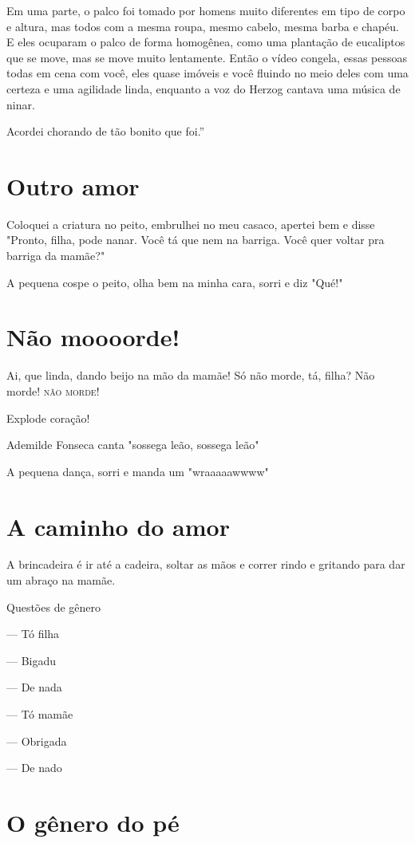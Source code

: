 Em uma parte, o palco foi tomado por homens muito diferentes em tipo de
corpo e altura, mas todos com a mesma roupa, mesmo cabelo, mesma barba e
chapéu. E eles ocuparam o palco de forma homogênea, como uma plantação
de eucaliptos que se move, mas se move muito lentamente. Então o vídeo
congela, essas pessoas todas em cena com você, eles quase imóveis e você
fluindo no meio deles com uma certeza e uma agilidade linda, enquanto a
voz do Herzog cantava uma música de ninar.

Acordei chorando de tão bonito que foi.''

\chapter{Outro amor}

Coloquei a criatura no peito, embrulhei no meu casaco, apertei bem e
disse "Pronto, filha, pode nanar. Você tá que nem na barriga. Você quer
voltar pra barriga da mamãe?"

A pequena cospe o peito, olha bem na minha cara, sorri e diz "Qué!"

\chapter{Não moooorde!}

Ai, que linda, dando beijo na mão da mamãe! Só não morde, tá, filha? Não
morde! \textsc{não} \textsc{morde}!

Explode coração!

Ademilde Fonseca canta "sossega leão, sossega leão"

A pequena dança, sorri e manda um "wraaaaawwww"

\chapter{A caminho do amor}

A brincadeira é ir até a cadeira, soltar as mãos e correr rindo e
gritando para dar um abraço na mamãe.

Questões de gênero

— Tó filha

— Bigadu

— De nada

— Tó mamãe

— Obrigada

— De nado

\chapter{O gênero do pé}

